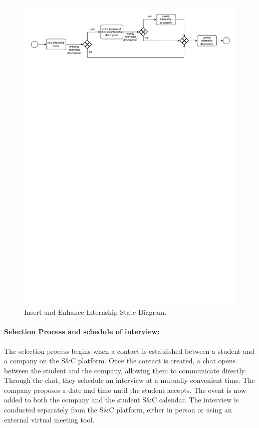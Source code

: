 \begin{figure}[H]
    \begin{center}
        \includegraphics[width=\linewidth]{Images/StateDiagram/Insert&EnhanceInternshipDescription.pdf}
        \caption{Insert and Enhance Internship State Diagram.}
        \label{fig:insert_enhance_intern_state_diag}%
    \end{center}
\end{figure}

\paragraph{Selection Process and schedule of interview:} The selection
  process begins when a contact is established between a student and a
  company on the S\&C platform. Once the contact is created, a chat
  opens between the student and the company, allowing them to
  communicate directly. Through the chat, they schedule an interview at
  a mutually convenient time. The company proposes a date and time until
  the student accepts. The event is now added to both the company and
  the student S\&C calendar.
  The interview is conducted separately from the S\&C platform, either in person or using an external virtual meeting tool.

